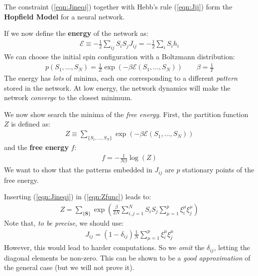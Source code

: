 \documentclass[../template.tex]{subfiles}
\begin{document}
The constraint (\ref{eqn:Jineqj}) together with Hebb's rule (\ref{eqn:Jij}) form the \textbf{Hopfield Model} for a neural network.    

If we now define the \textbf{energy} of the network as:
\begin{align*}
    \mathcal{E}\equiv -\frac{1}{2} \sum_{ij} S_i S_j J_{ij} = - \frac{1}{2} \sum_i S_i h_i  
\end{align*} 
We can choose the initial spin configuration with a Boltzmann distribution:
\begin{align*}
    p(S_1, \dots, S_N) = \frac{1}{Z} \exp\left(-\beta \mathcal{E}(S_1, \dots, S_N)\right) \qquad \beta = \frac{1}{T}  
\end{align*}
The energy has \textit{lots} of minima, each one corresponding to a different \textit{pattern} stored in the network. At low energy, the network dynamics will make the network \textit{converge} to the closest minimum.

We now show search the minima of the \textit{free energy}. First, the partition function $Z$ is defined as:
\begin{align}
    Z \equiv \sum_{\{S_1, \dots, S_N\}} \exp(-\beta \mathcal{E}(S_1, \dots, S_N))
    \label{eqn:Zfunc}
\end{align}  
and the \textbf{free energy} $f$:
\begin{align*}
    f = -\frac{1}{N \beta} \log(Z) 
\end{align*}  
We want to show that the  patterns embedded in $J_{ij}$ are $p$ stationary points of the free energy.   

Inserting (\ref{eqn:Jineqj}) in (\ref{eqn:Zfunc}) leads to:
\begin{align*}
    Z = \sum_{\{\bm{S}\}} \exp\left(\frac{\beta}{2 N} \sum_{i,j=1}^N S_i S_j  \sum_{\mu= 1}^p \xi_i^\mu \xi_j^\mu \right)
\end{align*}
Note that, \textit{to be precise}, we should use:
\begin{align*}
    J_{ij} = (1-\delta_{ij}) \frac{1}{N} \sum_{\mu=1}^p \xi_i^\mu \xi_j^\mu 
\end{align*} 
However, this would lead to harder computations. So we \textit{omit} the $\delta_{ij}$, letting the diagonal elements be non-zero. This can be shown to be a \textit{good approximation} of the general case (but we will not prove it).
\end{document}
